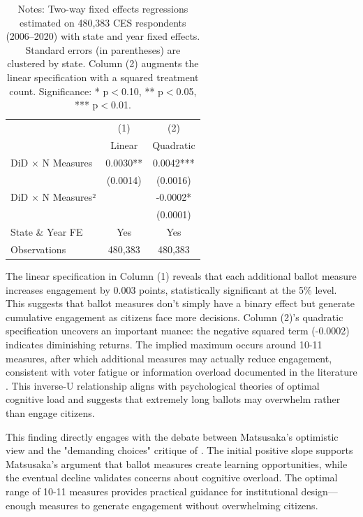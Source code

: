 \documentclass[12pt,letterpaper,oneside]{book}
\begin{document}
\begin{table}[H]
\centering
\caption{Intensity Effects: Number of Ballot Measures}
\label{tab:intensity_all}
\caption*{\footnotesize Notes: Two-way fixed effects regressions estimated on 480{,}383 CES respondents (2006--2020) with state and year fixed effects. Standard errors (in parentheses) are clustered by state. Column (2) augments the linear specification with a squared treatment count. Significance: * p$<$0.10, ** p$<$0.05, *** p$<$0.01.}
\begin{tabular}{lcc}
\hline\hline
& (1) & (2) \\
& Linear & Quadratic \\
\hline
DiD × N Measures & 0.0030** & 0.0042*** \\
& (0.0014) & (0.0016) \\
DiD × N Measures² & & -0.0002* \\
& & (0.0001) \\
\hline
State \& Year FE & Yes & Yes \\
Observations & 480,383 & 480,383 \\
\hline\hline
\end{tabular}
\end{table}

The linear specification in Column (1) reveals that each additional ballot measure increases engagement by 0.003 points, statistically significant at the 5\% level. This suggests that ballot measures don't simply have a binary effect but generate cumulative engagement as citizens face more decisions. Column (2)'s quadratic specification uncovers an important nuance: the negative squared term (-0.0002) indicates diminishing returns. The implied maximum occurs around 10-11 measures, after which additional measures may actually reduce engagement, consistent with voter fatigue or information overload documented in the literature \citep{bowler1998demanding, selb2009supersized}. This inverse-U relationship aligns with psychological theories of optimal cognitive load and suggests that extremely long ballots may overwhelm rather than engage citizens.

This finding directly engages with the debate between Matsusaka's optimistic view and the "demanding choices" critique of \citet{bowler1998demanding}. The initial positive slope supports Matsusaka's argument that ballot measures create learning opportunities, while the eventual decline validates concerns about cognitive overload. The optimal range of 10-11 measures provides practical guidance for institutional design—enough measures to generate engagement without overwhelming citizens.
\end{document}

